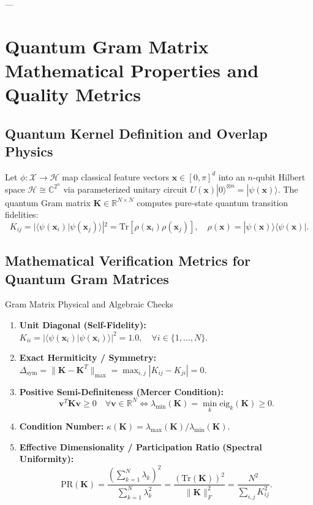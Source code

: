 \documentclass[11pt,a4paper]{article}
\begin{document}
---

\section{Quantum Gram Matrix Mathematical Properties and Quality Metrics}

\subsection{Quantum Kernel Definition and Overlap Physics}

Let $\phi: \mathcal{X} \to \mathcal{H}$ map classical feature vectors $\mathbf{x} \in [0, \pi]^d$ into an $n$-qubit Hilbert space $\mathcal{H} \cong \mathbb{C}^{2^n}$ via parameterized unitary circuit $U(\mathbf{x})|0\rangle^{\otimes n} = |\psi(\mathbf{x})\rangle$. The quantum Gram matrix $\mathbf{K} \in \mathbb{R}^{N \times N}$ computes pure-state quantum transition fidelities:
\begin{equation}
K_{ij} = |\langle \psi(\mathbf{x}_i) | \psi(\mathbf{x}_j) \rangle|^2 = \text{Tr}\left[ \rho(\mathbf{x}_i) \rho(\mathbf{x}_j) \right], \quad \rho(\mathbf{x}) = |\psi(\mathbf{x})\rangle \langle \psi(\mathbf{x})|.
\end{equation}

\subsection{Mathematical Verification Metrics for Quantum Gram Matrices}

\begin{metricbox}{Gram Matrix Physical and Algebraic Checks}
\begin{enumerate}[noitemsep]
    \item \textbf{Unit Diagonal (Self-Fidelity):} $K_{ii} = |\langle \psi(\mathbf{x}_i) | \psi(\mathbf{x}_i) \rangle|^2 = 1.0, \quad \forall i \in \{1, \dots, N\}$.
    \item \textbf{Exact Hermiticity / Symmetry:} $\Delta_{\text{sym}} = \|\mathbf{K} - \mathbf{K}^T\|_{\max} = \max_{i,j} |K_{ij} - K_{ji}| = 0$.
    \item \textbf{Positive Semi-Definiteness (Mercer Condition):}
    \begin{equation}
    \mathbf{v}^T \mathbf{K} \mathbf{v} \ge 0 \quad \forall \mathbf{v} \in \mathbb{R}^N \iff \lambda_{\min}(\mathbf{K}) = \min_{k} \text{eig}_k(\mathbf{K}) \ge 0.
    \end{equation}
    \item \textbf{Condition Number:} $\kappa(\mathbf{K}) = \lambda_{\max}(\mathbf{K}) / \lambda_{\min}(\mathbf{K})$.
    \item \textbf{Effective Dimensionality / Participation Ratio (Spectral Uniformity):}
    \begin{equation}
    \text{PR}(\mathbf{K}) = \frac{\left(\sum_{k=1}^N \lambda_k\right)^2}{\sum_{k=1}^N \lambda_k^2} = \frac{(\text{Tr}(\mathbf{K}))^2}{\|\mathbf{K}\|_F^2} = \frac{N^2}{\sum_{i,j} K_{ij}^2}.
    \end{equation}
\end{enumerate}
\end{metricbox}
\end{document}
